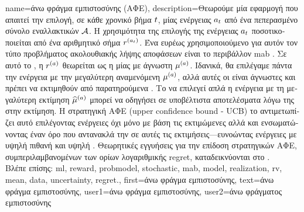 {name={\foreignlanguage{greek}{άνω φράγμα εμπιστοσύνης (ΑΦΕ)}},
	description={\foreignlanguage{greek}{Θεωρούμε μία εφαρμογή} 
		 \foreignlanguage{greek}{που απαιτεί την επιλογή, σε κάθε χρονικό βήμα $t$, μίας ενέργειας 
		$a_{t}$ από ένα πεπερασμένο σύνολο εναλλακτικών $\mathcal{A}$.} \foreignlanguage{greek}{Η χρησιμότητα της 
		επιλογής της ενέργειας $a_{t}$ ποσοτικοποιείται από ένα αριθμητικό σήμα}  
		$r^{(a_{t})}$. \foreignlanguage{greek}{Ένα ευρέως χρησιμοποιούμενο}  
		\foreignlanguage{greek}{για αυτόν τον τύπο προβλήματος ακολουθιακής λήψης αποφάσεων είναι το περιβάλλον} 
		 \gls{mab} \cite{Bubeck2012}. \foreignlanguage{greek}{Σε αυτό το} , 
		\foreignlanguage{greek}{η}  $r^{(a)}$ \foreignlanguage{greek}{θεωρείται ως η} 
		 \foreignlanguage{greek}{μίας}  \foreignlanguage{greek}{με άγνωστη} 
		 $\mu^{(a)}$. \foreignlanguage{greek}{Ιδανικά, θα επιλέγαμε πάντα την ενέργεια με την 
		μεγαλύτερη αναμενόμενη}  $\mu^{(a)}$, \foreignlanguage{greek}{αλλά αυτές οι}  
		 \foreignlanguage{greek}{είναι άγνωστες και πρέπει να εκτιμηθούν από παρατηρούμενα} . 
		\foreignlanguage{greek}{Το να επιλε\-γεί απλά η ενέργεια με τη μεγαλύτερη εκτίμηση $\widehat{\mu}^{(a)}$ 
		μπορεί να οδηγήσει σε υποβέλτιστα αποτελέσματα λόγω της}  \foreignlanguage{greek}{στην 
		εκτίμηση. Η στρατηγική ΑΦΕ} (upper confidence bound - UCB) \foreignlanguage{greek}{το αντιμετωπίζει αυτό 
		επιλέγοντας ενέργειες όχι μόνο με βάση τις εκτιμώμενες}  \foreignlanguage{greek}{αλλά και
		ενσωματώνοντας έναν όρο που αντανακλά την}  \foreignlanguage{greek}{σε αυτές τις 
		εκτιμήσεις—ευνοώντας ενέργειες με υψηλή πιθανή}  \foreignlanguage{greek}{και υψηλή} 
		. \foreignlanguage{greek}{Θεωρητικές εγγυήσεις για την επίδοση στρατηγικών ΑΦΕ, 
		συμπεριλαμβανομένων των ορίων λογαριθμικής} \gls{regret}, \foreignlanguage{greek}{καταδεικνύονται στο} \cite{Bubeck2012}.
		\\
		\foreignlanguage{greek}{Βλέπε επίσης:} \gls{ml}, \gls{reward}, \gls{probmodel}, \gls{stochastic}, \gls{mab}, \gls{model}, 
		\gls{realization}, \gls{rv}, \gls{mean}, \gls{data}, \gls{uncertainty}, \gls{regret}.},
	first={\foreignlanguage{greek}{άνω φράγμα εμπιστοσύνης}},
	text={\foreignlanguage{greek}{άνω φράγμα εμπιστοσύνης}},
	user1={\foreignlanguage{greek}{άνω φράγμα εμπιστοσύνης}}, %
    	user2={\foreignlanguage{greek}{άνω φράγματος εμπιστοσύνης}} %
}

